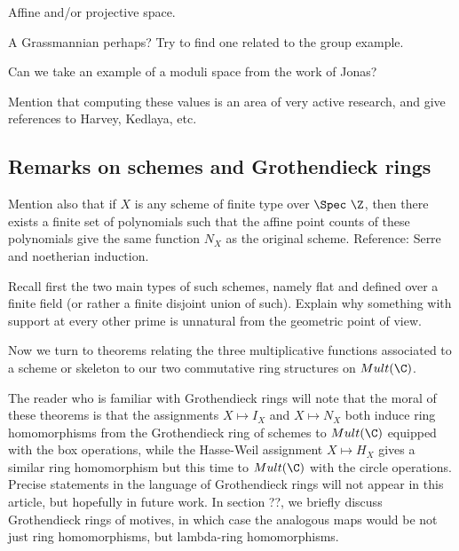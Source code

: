 \documentclass[a4paper]{article}
\begin{document}
\begin{example}
Affine and/or projective space.

\end{example}


\begin{example}
A Grassmannian perhaps? Try to find one related to the group example. 

\end{example}


\begin{example}
Can we take an example of a moduli space from the work of Jonas?

\end{example}


Mention that computing these values is an area of very active research, and give references to Harvey, Kedlaya, etc. 



\subsection{Remarks on schemes and Grothendieck rings}

Mention also that if $X$ is any scheme of finite type over $\Spec \ \Z$, then there exists a finite set of polynomials such that the affine point counts of these polynomials give the same function $N_X$ as the original scheme. Reference: Serre and noetherian induction.

Recall first the two main types of such schemes, namely flat and defined over a finite field (or rather a finite disjoint union of such). Explain why something with support at every other prime is unnatural from the geometric point of view.


Now we turn to theorems relating the three multiplicative functions associated to a scheme or skeleton to our two commutative ring structures on $Mult(\C)$. 

The reader who is familiar with Grothendieck rings will note that the moral of these theorems is that the assignments $X \mapsto I_X$ and $X \mapsto N_X$ both induce ring homomorphisms from the Grothendieck ring of schemes to $Mult(\C)$ equipped with the box operations, while the Hasse-Weil assignment $X \mapsto H_X$ gives a similar ring homomorphism but this time to $Mult(\C)$ with the circle operations. Precise statements in the language of Grothendieck rings will not appear in this article, but hopefully in future work. In section ??, we briefly discuss Grothendieck rings of motives, in which case the analogous maps would be not just ring homomorphisms, but lambda-ring homomorphisms.
\end{document}
